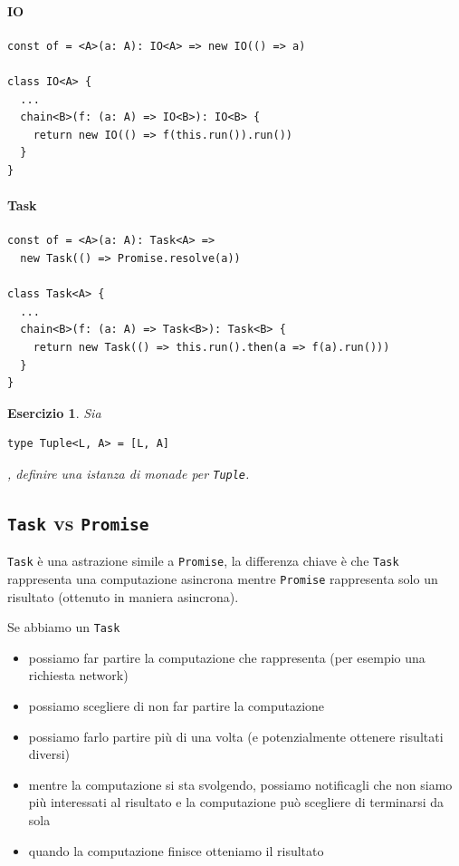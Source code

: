 \documentclass[12pt]{article}
\newtheorem{exercise}{Esercizio}[section]
\begin{document}
\paragraph{IO}

\begin{verbatim}
const of = <A>(a: A): IO<A> => new IO(() => a)

class IO<A> {
  ...
  chain<B>(f: (a: A) => IO<B>): IO<B> {
    return new IO(() => f(this.run()).run())
  }
}
\end{verbatim}

\paragraph{Task}

\begin{verbatim}
const of = <A>(a: A): Task<A> =>
  new Task(() => Promise.resolve(a))

class Task<A> {
  ...
  chain<B>(f: (a: A) => Task<B>): Task<B> {
    return new Task(() => this.run().then(a => f(a).run()))
  }
}
\end{verbatim}

\begin{exercise}
Sia \begin{verbatim}type Tuple<L, A> = [L, A]\end{verbatim}, definire una istanza di monade per \texttt{Tuple}.
\end{exercise}

\subsection{\texttt{Task} vs \texttt{Promise}}

\texttt{Task} è una astrazione simile a \texttt{Promise}, la differenza chiave è che \texttt{Task} rappresenta una computazione asincrona
mentre \texttt{Promise} rappresenta solo un risultato (ottenuto in maniera asincrona).

Se abbiamo un \texttt{Task}

\begin{itemize}
  \item possiamo far partire la computazione che rappresenta (per esempio una richiesta network)
  \item possiamo scegliere di non far partire la computazione
  \item possiamo farlo partire più di una volta (e potenzialmente ottenere risultati diversi)
  \item mentre la computazione si sta svolgendo, possiamo notificagli che non siamo più interessati al risultato e la computazione può scegliere di terminarsi da sola
  \item quando la computazione finisce otteniamo il risultato
\end{itemize}
\end{document}
